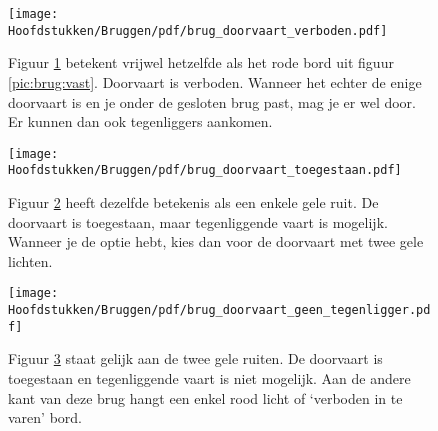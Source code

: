 \newpage

\begin{figure}[H]
  \centering
  \begin{minipage}[b]{0.18\textwidth}
    \texttt{[image: Hoofdstukken/Bruggen/pdf/brug\_doorvaart\_verboden.pdf]}
    \caption{}
    \label{pic:brug:verboden}
  \end{minipage}
  \hfill
  \begin{minipage}[t]{0.75\textwidth}
  	\vspace{-2.5cm}
    Figuur \ref{pic:brug:verboden} betekent vrijwel hetzelfde als het rode bord uit figuur \ref{pic:brug:vast}. Doorvaart is verboden. Wanneer het echter de enige doorvaart is en je onder de gesloten brug past, mag je er wel door. Er kunnen dan ook tegenliggers aankomen.
  \end{minipage}
\end{figure}
\vspace{-0.75cm}
\begin{figure}[H]
	\centering
	\begin{minipage}[b]{0.18\textwidth}
		\texttt{[image: Hoofdstukken/Bruggen/pdf/brug\_doorvaart\_toegestaan.pdf]}
		\caption{}
		\label{pic:brug:toegestaan}
	\end{minipage}
	\hfill
	\begin{minipage}[t]{0.75\textwidth}
	\vspace{-2.5cm}
	Figuur \ref{pic:brug:toegestaan} heeft dezelfde betekenis als een enkele gele ruit. De doorvaart is toegestaan, maar tegenliggende vaart is mogelijk. Wanneer je de optie hebt, kies dan voor de doorvaart met twee gele lichten.
\end{minipage}
\end{figure}
\vspace{-0.75cm}
\begin{figure}[H]
\centering
\begin{minipage}[b]{0.18\textwidth}
	\texttt{[image: Hoofdstukken/Bruggen/pdf/brug\_doorvaart\_geen\_tegenligger.pdf]}
	\caption{}
	\label{pic:brug:toegestaan_tegenligger}
\end{minipage}
\hfill
\begin{minipage}[t]{0.75\textwidth}
	\vspace{-2.5cm}
	Figuur \ref{pic:brug:toegestaan_tegenligger} staat gelijk aan de twee gele ruiten. De doorvaart is toegestaan en tegenliggende vaart is niet mogelijk. Aan de andere kant van deze brug hangt een enkel rood licht of `verboden in te varen' bord.
\end{minipage}
\end{figure}
